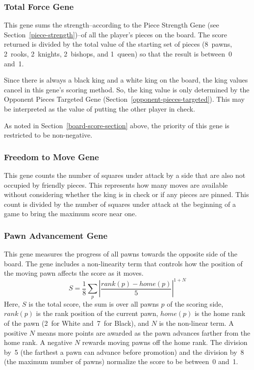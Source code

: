 \documentclass[letterpaper]{article}
\renewcommand{\_}{\allowbreak\textunderscore\allowbreak}
\begin{document}
\subsubsection{Total Force Gene}\label{total-force}
This gene sums the strength--according to the Piece Strength Gene (see Section~\ref{piece-strength})--of all the player's pieces on the board. The score returned is divided by the total value of the starting set of pieces (8~pawns, 2~rooks, 2~knights, 2~bishops, and 1~queen) so that the result is between~0 and~1.

Since there is always a black king and a white king on the board, the king values cancel in this gene's scoring method. So, the king value is only determined by the Opponent Pieces Targeted Gene (Section~\ref{opponent-pieces-targeted}). This may be interpreted as the value of putting the other player in check.

As noted in Section~\ref{board-score-section} above, the priority of this gene is restricted to be non-negative.

\subsubsection{Freedom to Move Gene}
This gene counts the number of squares under attack by a side that are also not occupied by friendly pieces. This represents how many moves are available without considering whether the king is in check or if any pieces are pinned. This count is divided by the number of squares under attack at the beginning of a game to bring the maximum score near one.

\subsubsection{Pawn Advancement Gene}
This gene measures the progress of all pawns towards the opposite side of the board. The gene includes a non-linearity term that controls how the position of the moving pawn affects the score as it moves.
\[S = \frac{1}{8}\sum_p \left|\frac{rank(p) - home(p)}{5}\right|^{1 + N}\]
Here, \(S\) is the total score, the sum is over all pawns \(p\) of the scoring side, \(rank(p)\) is the rank position of the current pawn, \(home(p)\) is the home rank of the pawn (2~for White and~7~for Black), and \(N\) is the non-linear term. A positive \(N\) means more points are awarded as the pawn advances farther from the home rank. A negative \(N\) rewards moving pawns off the home rank. The division by~5 (the farthest a pawn can advance before promotion) and the division by~8 (the maximum number of pawns) normalize the score to be between~0 and~1.
\end{document}
